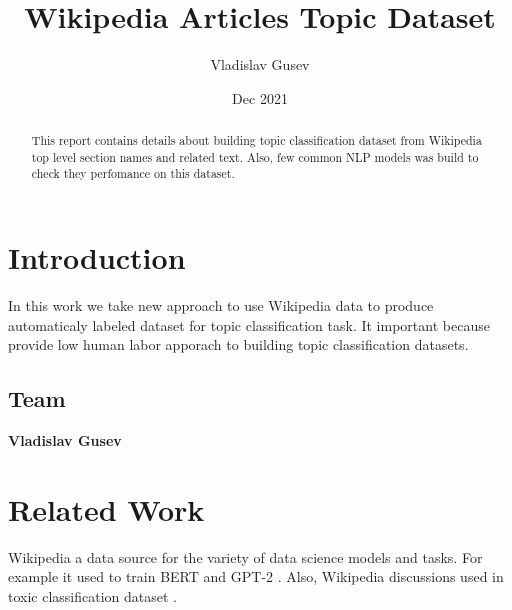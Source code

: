 \documentclass{article}
\title{Wikipedia Articles Topic Dataset}
\author{Vladislav Gusev}
\date{Dec 2021}
\begin{document}
\maketitle
\begin{abstract}
    This report contains details about building topic classification dataset from Wikipedia top level section names and related text. Also, few common NLP models was build to check they perfomance on this dataset.
\end{abstract}


\section{Introduction}
In this work we take new approach to use Wikipedia data to produce automaticaly labeled dataset for topic classification task. It important because provide low human labor apporach to building topic classification datasets. 

\subsection{Team}
\textbf{Vladislav Gusev}

\section{Related Work}
\label{sec:related}
Wikipedia a data source for the variety of data science models and tasks. For example it used to train BERT \cite{Devlin2018} and GPT-2 \cite{radford2019language}. Also, Wikipedia discussions used in toxic classification dataset \cite{thain2017wikipedia}.
\end{document}
